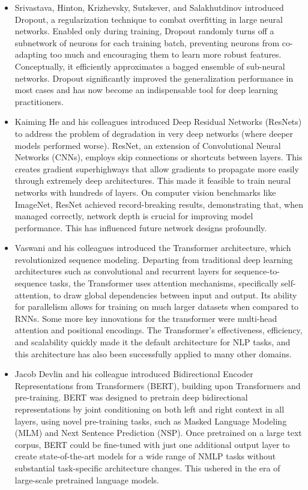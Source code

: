 \begin{itemize}
    \item \textbf{\cite{Srivastava2014}}
    Srivastava, Hinton, Krizhevsky, Sutskever, and Salakhutdinov introduced Dropout, a regularization technique to combat overfitting in large neural networks. Enabled only during training, Dropout randomly turns off a subnetwork of neurons for each training batch, preventing neurons from co-adapting too much and encouraging them to learn more robust features. Conceptually, it efficiently approximates a bagged ensemble of sub-neural networks. Dropout significantly improved the generalization performance in most cases and has now become an indispensable tool for deep learning practitioners. 
    
    \item \textbf{\cite{He2016}}
    Kaiming He and his colleagues introduced Deep Residual Networks (ResNets) to address the problem of degradation in very deep networks (where deeper models performed worse). ResNet, an extension of Convolutional Neural Networks (CNNs), employs skip connections or shortcuts between layers. This creates gradient superhighways that allow gradients to propagate more easily through extremely deep architectures. This made it feasible to train neural networks with hundreds of layers. On computer vision benchmarks like ImageNet, ResNet achieved record-breaking results, demonstrating that, when managed correctly, network depth is crucial for improving model performance. This has influenced future network designs profoundly. 
    
    \item \textbf{\cite{Vaswani2017}}
    Vaswani and his colleagues introduced the Transformer architecture, which revolutionized sequence modeling. Departing from traditional deep learning architectures such as convolutional and recurrent layers for sequence-to-sequence tasks, the Transformer uses attention mechanisms, specifically self-attention, to draw global dependencies between input and output. Its ability for parallelism allows for training on much larger datasets when compared to RNNs. Some more key innovations for the transformer were multi-head attention and positional encodings. The Transformer's effectiveness, efficiency, and scalability quickly made it the default architecture for NLP tasks, and this architecture has also been successfully applied to many other domains. 
    
    \item \textbf{\cite{Devlin2018}}
    Jacob Devlin and his colleague introduced Bidirectional Encoder Representations from Transformers (BERT), building upon Transformers and pre-training. BERT was designed to pretrain deep bidirectional representations by joint conditioning on both left and right context in all layers, using novel pre-training tasks, such as Masked Language Modeling (MLM) and Next Sentence Prediction (NSP). Once pretrained on a large text corpus, BERT could be fine-tuned with just one additional output layer to create state-of-the-art models for a wide range of NMLP tasks without substantial task-specific architecture changes. This ushered in the era of large-scale pretrained language models. 
    

\end{itemize}
